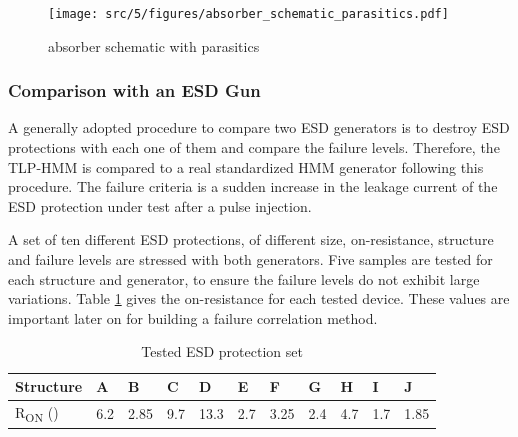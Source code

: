 \begin{figure}[!h]
  \centering
  \texttt{[image: src/5/figures/absorber\_schematic\_parasitics.pdf]}
  \caption{absorber schematic with parasitics}
  \label{fig:absorber_schematic_parasitics}
\end{figure}




\subsubsection{Comparison with an ESD Gun}

A generally adopted procedure to compare two ESD generators is to destroy ESD protections with each one of them and compare the failure levels.
Therefore, the TLP-HMM is compared to a real standardized HMM generator following this procedure.
The failure criteria is a sudden increase in the leakage current of the ESD protection under test after a pulse injection.

A set of ten different ESD protections, of different size, on-resistance, structure and failure levels are stressed with both generators.
Five samples are tested for each structure and generator, to ensure the failure levels do not exhibit large variations.
Table \ref{tab:esd-protections} gives the on-resistance for each tested device.
These values are important later on for building a failure correlation method.

\begin{table}[!h]
\centering
\begin{tabular}{@{}lllllllllll@{}}
\toprule
Structure                          & A    & B    & C     & D    & E   & F   & G   & H   & I   & J   \\ \midrule
R\textsubscript{ON} (\textOmega{}) & 6.2  & 2.85 & 9.7  & 13.3 & 2.7 & 3.25& 2.4 & 4.7 & 1.7 & 1.85 \\
\end{tabular}
\caption{Tested ESD protection set}
\label{tab:esd-protections}
\end{table}

